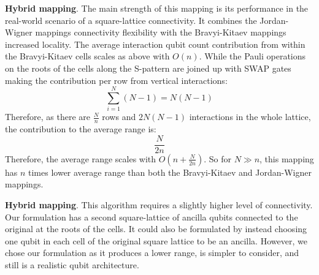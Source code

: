 \documentclass[pdftex,pra,aps,twocolumn,twoside]{revtex4-2}
\theoremstyle{plain}
\theoremstyle{note}
\newcommand\+{{\footnotesize \raisebox{0.3ex}{+}}}
\begin{document}
\textbf {Hybrid mapping}.
The main strength of this mapping is its performance in the real-world scenario of a square-lattice connectivity. It combines the Jordan-Wigner mappings connectivity flexibility with the Bravyi-Kitaev mappings increased locality. The average interaction qubit count contribution from within the Bravyi-Kitaev cells scales as above with $O(n)$. While the Pauli operations on the roots of the cells along the S-pattern are joined up with SWAP gates making the contribution per row from vertical interactions:
\begin{equation}
        \sum_{i=1}^{N} (N-1) = N(N-1)
\end{equation}
Therefore, as there are $\frac{N}{n}$ rows and $2N(N-1)$ interactions in the whole lattice, the contribution to the average range is:
\begin{equation}
     \frac{N}{2n}
\end{equation}
Therefore, the average range scales with $O(n + \frac{N}{2n})$. So for $N \gg n$, this mapping has $n$ times lower average range than both the Bravyi-Kitaev and Jordan-Wigner mappings.

\textbf {Hybrid\+ mapping}.
This algorithm requires a slightly higher level of connectivity. Our formulation has a second square-lattice of ancilla qubits connected to the original at the roots of the cells. It could also be formulated by instead choosing one qubit in each cell of the original square lattice to be an ancilla. However, we chose our formulation as it produces a lower range, is simpler to consider, and still is a realistic qubit architecture.
\end{document}
